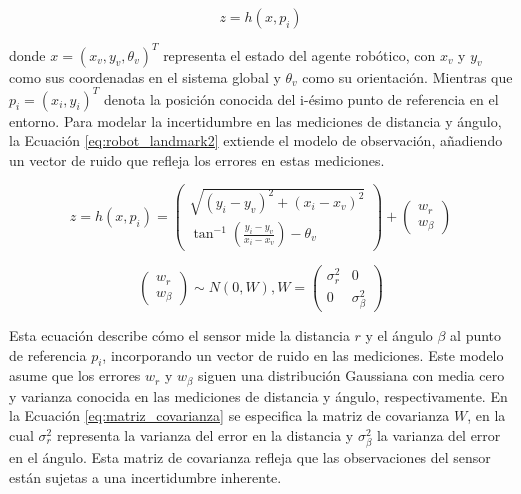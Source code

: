 \begin{equation}
	\label{eq:robot_landmark}
	z = h(x,p_i) 
\end{equation}

donde $x = (x_v, y_v, \theta_v)^T$ representa el estado del agente robótico, con $x_v$ y $y_v$ como sus coordenadas en el sistema global y $\theta_v$ como su orientación. Mientras que $p_i = (x_i, y_i)^T$ denota la posición conocida del i-ésimo punto de referencia en el entorno. Para modelar la incertidumbre en las mediciones de distancia y ángulo, la Ecuación \eqref{eq:robot_landmark2} extiende el modelo de observación, añadiendo un vector de ruido que refleja los errores en estas mediciones.

\begin{equation}
	\label{eq:robot_landmark2}
	z = h(x, p_i) =
	\begin{pmatrix}
		\sqrt{(y_i - y_v)^2 + (x_i - x_v)^2} \\
		\tan^{-1}\left(\frac{y_i - y_v}{x_i - x_v}\right) - \theta_v
	\end{pmatrix}
	+
	\begin{pmatrix}
		w_r \\
		w_\beta
	\end{pmatrix}
\end{equation}

\begin{equation}
	\label{eq:matriz_covarianza}
	\begin{pmatrix}
		w_r \\
		w_\beta
	\end{pmatrix}
	\sim
	N(0,W),	W =
	\begin{pmatrix}
		\sigma_r^2 & 0 \\
		0 & \sigma_\beta^2
	\end{pmatrix}
\end{equation}

Esta ecuación describe cómo el sensor mide la distancia $r$ y el ángulo $\beta$ al punto de referencia $p_i$, incorporando un vector de ruido en las mediciones. Este modelo asume que los errores $w_r$ y $w_\beta$ siguen  una distribución Gaussiana con media cero y varianza conocida en las mediciones de distancia y ángulo, respectivamente. En la Ecuación \ref{eq:matriz_covarianza} se especifica la matriz de covarianza $W$, en la cual $\sigma_r^2$ representa la varianza del error en la distancia y $\sigma_\beta^2$ la varianza del error en el ángulo. Esta matriz de covarianza refleja que las observaciones del sensor están sujetas a una incertidumbre inherente.

